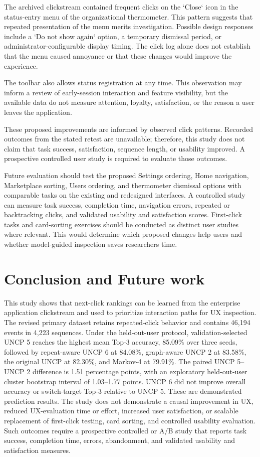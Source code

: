 \documentclass[sn-mathphys-num, Numbered]{sn-jnl}%
\theoremstyle{thmstyleone}%
\theoremstyle{thmstyletwo}%
\theoremstyle{thmstylethree}%
\begin{document}
The archived clickstream contained frequent clicks on the `Close` icon in the status-entry menu of the organizational thermometer. This pattern suggests that repeated presentation of the menu merits investigation. Possible design responses include a `Do not show again` option, a temporary dismissal period, or administrator-configurable display timing. The click log alone does not establish that the menu caused annoyance or that these changes would improve the experience.

The toolbar also allows status registration at any time. This observation may inform a review of early-session interaction and feature visibility, but the available data do not measure attention, loyalty, satisfaction, or the reason a user leaves the application.

These proposed improvements are informed by observed click patterns. Recorded outcomes from the stated retest are unavailable; therefore, this study does not claim that task success, satisfaction, sequence length, or usability improved. A prospective controlled user study is required to evaluate those outcomes.

Future evaluation should test the proposed Settings ordering, Home navigation, Marketplace sorting, Users ordering, and thermometer dismissal options with comparable tasks on the existing and redesigned interfaces. A controlled study can measure task success, completion time, navigation errors, repeated or backtracking clicks, and validated usability and satisfaction scores. First-click tasks and card-sorting exercises should be conducted as distinct user studies where relevant. This would determine which proposed changes help users and whether model-guided inspection saves researchers time.

\section{Conclusion and Future work}
This study shows that next-click rankings can be learned from the enterprise application clickstream and used to prioritize interaction paths for UX inspection. The revised primary dataset retains repeated-click behavior and contains 46,194 events in 4,223 sequences. Under the held-out-user protocol, validation-selected UNCP 5 reaches the highest mean Top-3 accuracy, 85.09\% over three seeds, followed by repeat-aware UNCP 6 at 84.08\%, graph-aware UNCP 2 at 83.58\%, the original UNCP at 82.30\%, and Markov-4 at 79.91\%. The paired UNCP 5--UNCP 2 difference is 1.51 percentage points, with an exploratory held-out-user cluster bootstrap interval of 1.03--1.77 points. UNCP 6 did not improve overall accuracy or switch-target Top-3 relative to UNCP 5. These are demonstrated prediction results. The study does not demonstrate a causal improvement in UX, reduced UX-evaluation time or effort, increased user satisfaction, or scalable replacement of first-click testing, card sorting, and controlled usability evaluation. Such outcomes require a prospective controlled or A/B study that reports task success, completion time, errors, abandonment, and validated usability and satisfaction measures.
\end{document}
